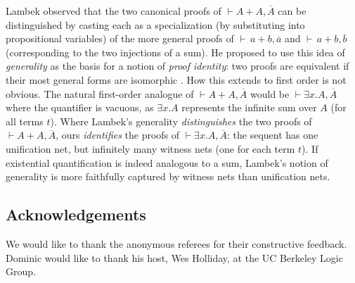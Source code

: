 \documentclass[twoside,a4paper]{article}
\newcommand\+{+}
\renewcommand\*{\times}
\newcommand\dual[1]{\overline{#1}}
\newcommand\seq[2]{{\vdash}#1,#2}
\begin{document}
%
%
Lambek observed that the two canonical proofs of $\seq{A{\+}A}{\dual A}$ can be distinguished by casting each as a specialization (by substituting into propositional variables) of the more general proofs of $\seq{\,a{\+}b}{\dual a}$ and $\seq{\,a{\+}b}{\dual b}$ (corresponding to the two injections of a sum). He proposed to use this idea of \emph{generality} as the basis for a notion of \emph{proof identity}: two proofs are equivalent if their most general forms are isomorphic \cite{Lambek-1968-1972}. How this extends to first order is not obvious. The natural first-order analogue of $\seq{A{\+}A}{\dual A}$ would be $\seq{\exists x.A}{\dual A}$ where the quantifier is vacuous, as $\exists x.A$ represents the infinite sum over $A$ (for all terms $t$). Where Lambek's generality \emph{distinguishes} the two proofs of $\seq{A{\+}A}{\dual A}$, ours \emph{identifies} the proofs of $\seq{\exists x.A}{\dual A}$: the sequent has one unification net, but infinitely many witness nets (one for each term $t$). If existential quantification is indeed analogous to a sum, Lambek's notion of generality is more faithfully captured by witness nets than unification nets.




\subsection*{Acknowledgements}

We would like to thank the anonymous referees for their constructive feedback. Dominic would like to thank his host, Wes Holliday, at the UC Berkeley Logic Group.





\newpage
\appendix

\end{document}

